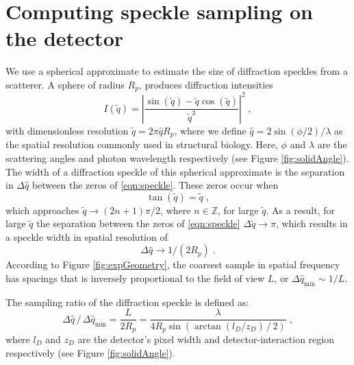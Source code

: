 \documentclass[]{iucr}              %
\begin{document}
\section{Computing speckle sampling on the detector}\label{sec:speckle}
We use a spherical approximate to estimate the size of diffraction speckles from a scatterer. A sphere of radius $R_p$, produces diffraction intensities 
\begin{equation}
I(\widetilde{q}) = \left|\frac{\sin(\widetilde{q}) - \widetilde{q} \cos(\widetilde{q})} {\widetilde{q}^3} \right|^2 \;, \label{eqn:speckle}
\end{equation}
with dimensionless resolution $\widetilde{q} = 2 \pi \widehat{q} R_p$, where we define $\widehat{q} = 2 \sin(\phi/2) / \lambda$ as the spatial resolution commonly used in structural biology. Here, $\phi$ and $\lambda$ are the scattering angles and photon wavelength respectively (see Figure \ref{fig:solidAngle}). The width of a diffraction speckle of this spherical approximate is the separation in $\Delta \widehat{q} $ between the zeros of \eqref{eqn:speckle}. These zeros occur when 
\begin{equation}
\tan(\widetilde{q}) = \widetilde{q} \;,
\end{equation}
which approaches $\widetilde{q} \to (2n+1) \pi / 2$, where $n \in \mathbb{Z}$, for large $\widetilde{q}$. As a result, for large $\widetilde{q}$ the separation between the zeros of \eqref{eqn:speckle} $\Delta \widetilde{q} \to \pi$, which results in a speckle width in spatial resolution of 
\begin{equation}
\Delta \widehat{q} \to 1/(2 R_p) \;. 
\end{equation}
According to Figure \ref{fig:expGeometry}, the coarsest sample in spatial frequency has spacings that is inversely proportional to the field of view $L$, or $\Delta \widehat{q}_{\text{min}} \sim 1/L$. 

The sampling ratio of the diffraction speckle is defined as:
\begin{equation}
\Delta \widehat{q} \,/\, \Delta \widehat{q}_{\text{min}} = \frac{L}{2R_p} = \frac{\lambda}{4 R_p \sin\left( \arctan (l_D / z_D) \,/\,2 \right)}\; ,
\end{equation}
where $l_D$ and $z_D$ are the detector's pixel width and detector-interaction region respectively (see Figure \ref{fig:solidAngle}).
\end{document}
